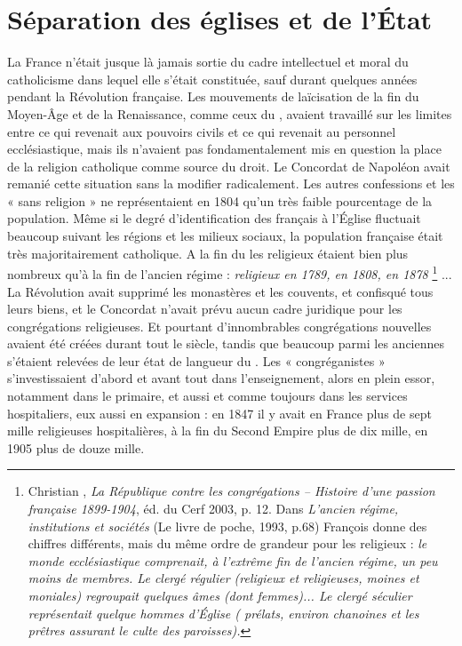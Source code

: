 
\chapter{Séparation des églises et de l'État}


 La France n'était jusque là jamais sortie du cadre intellectuel et moral du catholicisme dans lequel elle s'était constituée, sauf durant quelques années pendant la Révolution française. Les mouvements de laïcisation de la fin du Moyen-Âge et de la Renaissance, comme ceux du , avaient travaillé sur les limites entre ce qui revenait aux pouvoirs civils et ce qui revenait au personnel ecclésiastique, mais ils n'avaient pas fondamentalement mis en question la place de la religion catholique comme source du droit. Le Concordat de \hbox{Napoléon} avait remanié cette situation sans la modifier radicalement. Les autres confessions et les « sans religion » ne représentaient en 1804 qu'un très faible pourcentage de la population. Même si le degré d'identification des français à l'Église fluctuait beaucoup suivant les régions et les milieux sociaux, la population française était très majoritairement catholique. A la fin du  les religieux étaient bien plus nombreux qu'à la fin de l'ancien régime : {\emph{ religieux en 1789,  en 1808,  en 1878}%
\footnote{Christian , \emph{La République contre les congrégations – Histoire d'une passion française 1899-1904}, éd. du Cerf 2003, p. 12. Dans \emph{L'ancien régime, institutions et sociétés} (Le livre de poche, 1993, p.68) François  donne des chiffres différents, mais du même ordre de grandeur pour les religieux : \emph{le monde ecclésiastique comprenait, à l'extrême fin de l'ancien régime, un peu moins de  membres. Le clergé régulier (religieux et religieuses, moines et moniales) regroupait quelques  âmes (dont  femmes)... Le clergé séculier représentait quelque  hommes d'Église ( prélats, environ  chanoines et les  prêtres assurant le culte des  paroisses).}}%
}... La Révolution avait supprimé les monastères et les couvents, et confisqué tous leurs biens, et le Concordat n'avait prévu aucun cadre juridique pour les congrégations religieuses. Et pourtant d'innombrables congrégations nouvelles avaient été créées durant tout le siècle, tandis que beaucoup parmi les anciennes s'étaient relevées de leur état de langueur du . Les « congréganistes » s'investissaient d'abord et avant tout dans l'enseignement, alors en plein essor, notamment dans le primaire, et aussi et comme toujours dans les services hospitaliers, eux aussi en expansion : en 1847 il y avait en France plus de sept mille religieuses hospitalières, à la fin du Second Empire plus de dix mille, en 1905 plus de douze mille.

